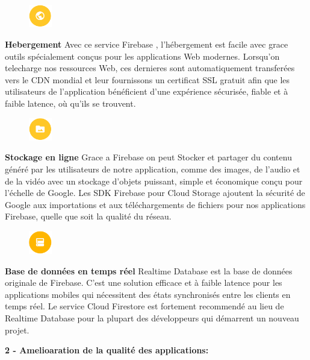\begin{figure}
	\includegraphics[width=1cm]{images/Chapitre2/Firebase_services/hosting.PNG}
\end{figure}
\textbf{Hebergement} Avec ce service Firebase , l'hébergement est facile avec grace outils spécialement
conçus pour les applications Web modernes. Lorsqu'on telecharge nos
ressources Web, ces dernieres sont automatiquement transferées vers le  CDN mondial
et leur fournissons un certificat SSL gratuit afin que les utilisateurs de l'application
bénéficient d'une expérience sécurisée, fiable et à faible latence, où qu'ils se trouvent.\medskip

\begin{figure}
\includegraphics[width=1cm]{images/Chapitre2/Firebase_services/cloud_storage.PNG}
\end{figure}
\textbf{Stockage en ligne} Grace a Firebase on peut Stocker et partager du contenu généré par les utilisateurs de notre application,
comme des images, de l'audio et de la vidéo avec un stockage d'objets puissant,
simple et économique conçu pour l'échelle de Google. Les SDK Firebase pour Cloud
Storage ajoutent la sécurité de Google aux importations et aux téléchargements de
fichiers pour nos applications Firebase, quelle que soit la qualité du réseau.\medskip

\begin{figure}
    \includegraphics[width=1cm]{images/Chapitre2/Firebase_services/realtime_database.PNG}
    \end{figure}
\textbf{Base de données en temps réel} Realtime Database est la base de données originale
de Firebase. C'est une solution efficace et à faible latence pour les applications
mobiles qui nécessitent des états synchronisés entre les clients en temps réel.
Le service Cloud Firestore est fortement recommendé au lieu de Realtime Database pour la plupart
des développeurs qui démarrent un nouveau projet.\bigskip

\tab \textbf{2 - Amelioaration de la qualité des applications:}\bigskip

